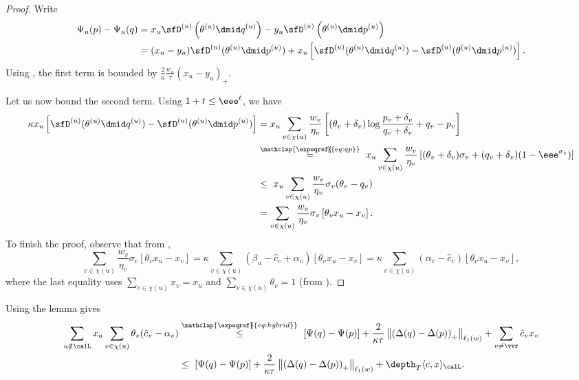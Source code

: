 \begin{proof}
	Write
	\begin{align*}
	\Psi_u(p) - \Psi_u(q) &= 
	x_u \sfD^{(u)}\left(\theta^{(u)} \dmid q^{(u)}\right) 
	-y_u \sfD^{(u)}\left(\theta^{(u)} \dmid p^{(u)}\right)  \\
	&= (x_u-y_u) \sfD^{(u)}(\theta^{(u)} \dmid p^{(u)}) + x_u \left[\sfD^{(u)}(\theta^{(u)} \dmid q^{(u)})-\sfD^{(u)}(\theta^{(u)} \dmid p^{(u)})\right].
	\end{align*}
	Using , the first term is bounded by $\frac{2}{\kappa} \frac{w_u}{\tau} (x_u-y_u)_+ $.
	
	Let us now bound the second term.
	Using $1+t \leq \eee^t$, we have
	\begin{align*}
	\kappa x_u \left[\sfD^{(u)}(\theta^{(u)} \dmid q^{(u)})-\sfD^{(u)}(\theta^{(u)} \dmid p^{(u)})\right] &=
	x_u \sum_{v \in \chi(u)} \frac{w_v}{\eta_v} \left[(\theta_v+\delta_v) \log \frac{p_v+\delta_v}{q_v+\delta_v}+q_v-p_v\right] \\
	\  &\stackrel{\mathclap{\expeqref{\!\!\!\!}{eq:qp}}}{=}\ 
	x_u \sum_{v \in \chi(u)} \frac{w_v}{\eta_v} \left[(\theta_v+\delta_v) \sigma_v + (q_v+\delta_v) (1-\eee^{\sigma_v})\right] \\
	&\leq\ 
	x_u \sum_{v \in \chi(u)} \frac{w_v}{\eta_v} \sigma_v (\theta_v-q_v) \\
	&= \sum_{v \in \chi(u)} \frac{w_v}{\eta_v} \sigma_v \left[\theta_v x_u - x_v\right].
	\end{align*}
	To finish the proof, observe that from \expeqref{equation}{eq:kkt2},
	\[
	\sum_{v \in \chi(u)} \frac{w_v}{\eta_v} \sigma_v \left[\theta_v x_u - x_v\right] =
	\kappa \sum_{v \in \chi(u)} (\beta_u - \hat{c}_v + \alpha_v) \left[\theta_v x_u - x_v\right] =
	\kappa \sum_{v \in \chi(u)} (\alpha_v - \hat{c}_v) \left[\theta_v x_u - x_v\right],
	\]
	where the last equality uses $\sum_{v \in \chi(u)} x_v = x_u$ and $\sum_{v \in \chi(u)} \theta_v = 1$ (from ).
\end{proof}

Using the lemma gives
\begin{align*}
\sum_{u \notin \calL} x_u \sum_{v \in \chi(u)} \theta_v (\hat{c}_v-\alpha_v) 
&\stackrel{\mathclap{\expeqref{\!\!\!}{eq:hybrid}}}{\leq}\ 
[\Psi(q)-\Psi(p)] + \frac{2}{\kappa \tau} \left\|\left(\Delta(q)-\Delta(p)\right)_{+}\right\|_{\ell_1(w)}
+ \sum_{v \neq \vvr} \hat{c}_v x_v \\
&\leq\ 
[\Psi(q)-\Psi(p)] + \frac{2}{\kappa \tau} \left\|\left(\Delta(q)-\Delta(p)\right)_{+}\right\|_{\ell_1(w)}
+ \depth_T \langle c,x\rangle_{\calL}.
\end{align*}

